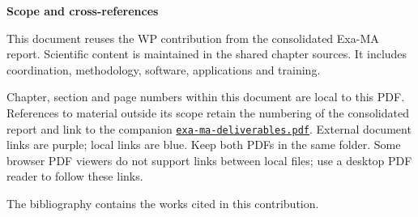 \noindent\textbf{Scope and cross-references}\par
This document reuses the WP\WPNumber{} contribution from the consolidated
Exa-MA report. Scientific content is maintained in the shared chapter sources.
\ifnum{}
  It includes coordination, methodology, software, applications and training.
\fi

Chapter, section and page numbers within this document are local to this PDF.
References to material outside its scope retain the numbering of the
consolidated report and link to the companion
\href{\WPReportPDF}{\texttt{exa-ma-deliverables.pdf}}.
External document links are purple; local links are blue.
Keep both PDFs in the same folder. Some browser PDF viewers do not support
links between local files; use a desktop PDF reader to follow these links.

The bibliography contains the works cited in this contribution.
\par\bigskip
